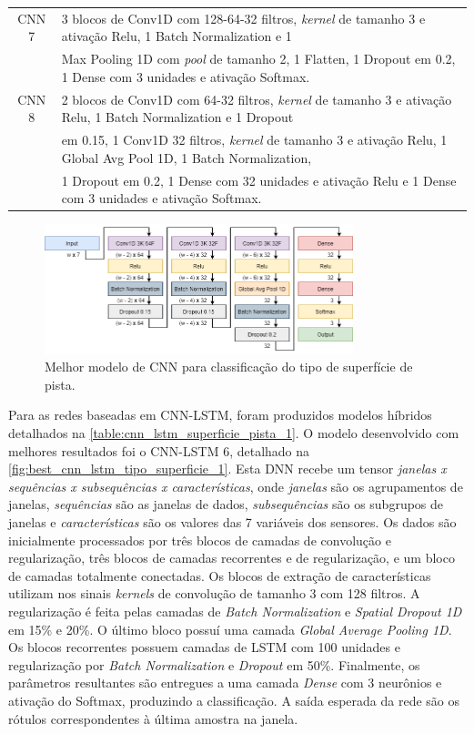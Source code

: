 \begin{center}
\begin{longtable}{cl}
CNN 7 &  3 blocos de Conv1D com 128-64-32 filtros, \textit{kernel} de tamanho 3 e ativação Relu, 1 Batch Normalization e 1 \\ & Max Pooling 1D com \textit{pool} de tamanho 2, 1 Flatten, 1 Dropout em 0.2, 1 Dense com 3 unidades e ativação Softmax. \\ \midrule
CNN 8 & 2 blocos de Conv1D com 64-32 filtros, \textit{kernel} de tamanho 3 e ativação Relu, 1 Batch Normalization e 1 Dropout \\ & em 0.15, 1 Conv1D 32 filtros, \textit{kernel} de tamanho 3 e ativação Relu, 1 Global Avg Pool 1D, 1 Batch Normalization, \\ & 1 Dropout em 0.2, 1 Dense com 32 unidades e ativação Relu e 1 Dense com 3 unidades e ativação Softmax. \\ \bottomrule
\end{longtable}
\end{center}

\begin{figure}[H]
  \centering
  \caption{Melhor modelo de CNN para classificação do tipo de superfície de pista.}
  \label{fig:best_cnn_dnn_tipo_superficie_1}
  \includegraphics[width=0.8\textwidth]{figuras/fig_32.png}
\end{figure}

Para as redes baseadas em CNN-LSTM, foram produzidos modelos híbridos detalhados na \autoref{table:cnn_lstm_superficie_pista_1}. O modelo desenvolvido com melhores resultados foi o CNN-LSTM 6, detalhado na \autoref{fig:best_cnn_lstm_tipo_superficie_1}. Esta DNN recebe um tensor \emph{janelas x sequências x subsequências x características}, onde \emph{janelas} são os agrupamentos de janelas, \emph{sequências} são as janelas de dados, \emph{subsequências} são os subgrupos de janelas e \emph{características} são os valores das 7 variáveis dos sensores. Os dados são inicialmente processados por três blocos de camadas de convolução e regularização, três blocos de camadas recorrentes e de regularização, e um bloco de camadas totalmente conectadas. Os blocos de extração de características utilizam nos sinais \textit{kernels} de convolução de tamanho 3 com 128 filtros. A regularização é feita pelas camadas de \textit{Batch Normalization} e \textit{Spatial Dropout 1D} em 15\% e 20\%. O último bloco possuí uma camada \textit{Global Average Pooling 1D}. Os blocos recorrentes possuem camadas de LSTM com 100 unidades e regularização por \textit{Batch Normalization} e \textit{Dropout} em 50\%. Finalmente, os parâmetros resultantes são entregues a uma camada \textit{Dense} com 3 neurônios e ativação do Softmax, produzindo a classificação. A saída esperada da rede são os rótulos correspondentes à última amostra na janela.

